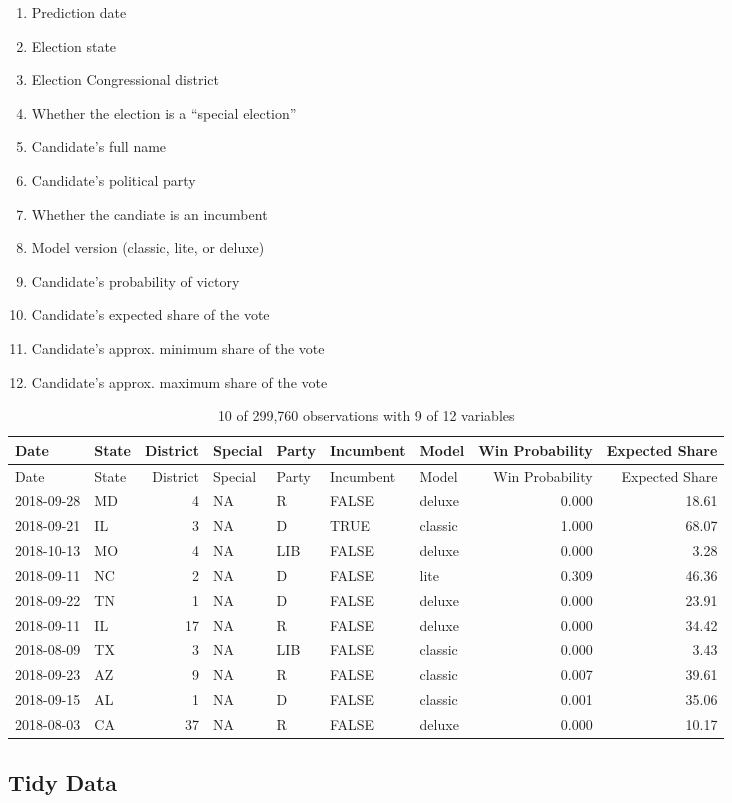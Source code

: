 \documentclass[]{article}
\providecommand{\tightlist}{%
  \setlength{\itemsep}{0pt}\setlength{\parskip}{0pt}}
\begin{document}
\begin{enumerate}
\def\labelenumi{\arabic{enumi}.}
\tightlist
\item
  Prediction date
\item
  Election state
\item
  Election Congressional district
\item
  Whether the election is a ``special election''
\item
  Candidate's full name
\item
  Candidate's political party
\item
  Whether the candiate is an incumbent
\item
  Model version (classic, lite, or deluxe)
\item
  Candidate's probability of victory
\item
  Candidate's expected share of the vote
\item
  Candidate's approx. minimum share of the vote
\item
  Candidate's approx. maximum share of the vote
\end{enumerate}

\begin{longtable}[]{@{}llrllllrr@{}}
\caption{10 of 299,760 observations with 9 of 12
variables}\tabularnewline
\toprule
Date & State & District & Special & Party & Incumbent & Model & Win
Probability & Expected Share\tabularnewline
\midrule
\endfirsthead
\toprule
Date & State & District & Special & Party & Incumbent & Model & Win
Probability & Expected Share\tabularnewline
\midrule
\endhead
2018-09-28 & MD & 4 & NA & R & FALSE & deluxe & 0.000 &
18.61\tabularnewline
2018-09-21 & IL & 3 & NA & D & TRUE & classic & 1.000 &
68.07\tabularnewline
2018-10-13 & MO & 4 & NA & LIB & FALSE & deluxe & 0.000 &
3.28\tabularnewline
2018-09-11 & NC & 2 & NA & D & FALSE & lite & 0.309 &
46.36\tabularnewline
2018-09-22 & TN & 1 & NA & D & FALSE & deluxe & 0.000 &
23.91\tabularnewline
2018-09-11 & IL & 17 & NA & R & FALSE & deluxe & 0.000 &
34.42\tabularnewline
2018-08-09 & TX & 3 & NA & LIB & FALSE & classic & 0.000 &
3.43\tabularnewline
2018-09-23 & AZ & 9 & NA & R & FALSE & classic & 0.007 &
39.61\tabularnewline
2018-09-15 & AL & 1 & NA & D & FALSE & classic & 0.001 &
35.06\tabularnewline
2018-08-03 & CA & 37 & NA & R & FALSE & deluxe & 0.000 &
10.17\tabularnewline
\bottomrule
\end{longtable}

\subsection{Tidy Data}\label{tidy-data}
\end{document}
